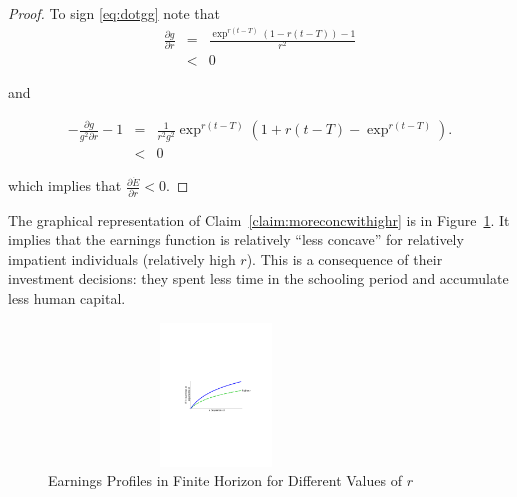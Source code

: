 \begin{proof}
\indent To sign \eqref{eq:dotgg} note that
\begin{eqnarray}
\frac{\partial g}{\partial r} &=& \frac{\exp^{r(t-T)} \left( 1 - r(t - T) \right) - 1 }{r^2} \nonumber \\
&<& 0 \label{eq:partialgr}
\end{eqnarray}

\noindent and

\begin{eqnarray}
- \frac{\partial g }{g^2 \partial r} - 1 &=& \frac{1}{r^2g^2} \exp^{r(t-T)} \left( 1 + r(t - T) - \exp^{r(t-T)} \right). \nonumber \\
&<& 0
\end{eqnarray}

\noindent which implies that $\frac{\partial \dot{E}}{\partial r} < 0$. 
\end{proof}

\indent The graphical representation of Claim~\ref{claim:moreconcwithighr} is in Figure~\ref{fig:earnprofr}. It implies that the earnings function is relatively ``less concave'' for relatively impatient individuals (relatively high $r$). This is a consequence of their investment decisions: they spent less time in the schooling period and accumulate less human capital.

\begin{center}
\begin{figure}[H]
\caption{Earnings Profiles in Finite Horizon for Different Values of $r$ } \label{fig:earnprofr}
\centering
\includegraphics[width=3.5in, height=1.5in]{Figures/fig-earnings-growth.pdf}
\floatfoot{\begin{small}
\end{small}}
\end{figure}
\end{center}

